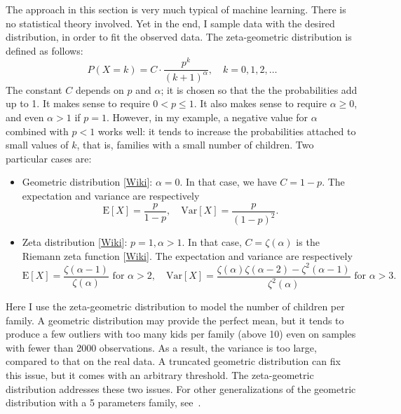 \documentclass[oneside,10pt]{book}
\begin{document}
The approach in this section is very much typical of machine learning. There is no statistical theory involved. Yet in the end,
 I sample data with the desired distribution, in order to fit the observed data. The
\textcolor{index}{zeta-geometric distribution} is defined as follows:
\begin{equation}
P(X = k) = C\cdot \frac{p^k}{(k+1)^\alpha},\quad k=0,1,2,\dots \label{treces}
\end{equation}
The constant $C$ depends on $p$ and $\alpha$; it is chosen so that the the probabilities add up to 1. It makes sense
 to require $0< p\leq 1$. It also makes sense to require $\alpha\geq 0$, and even $\alpha > 1$ if $p=1$. However, in my example,
  a negative value for $\alpha$ combined with $p<1$ works well: it tends to increase the probabilities attached to small values of $k$, that is, families with a small
 number of children.  Two particular cases are:\vspace{1ex}
\begin{itemize}
\item \textcolor{index}{Geometric distribution} [\href{https://en.wikipedia.org/wiki/Geometric_distribution}{Wiki}]: $\alpha = 0$. In that case, we have $C = 1-p$. The expectation and variance are respectively
 $$\text{E}[X]=\frac{p}{1-p}, \quad \text{Var}[X]=\frac{p}{(1-p)^2}.$$
\item \textcolor{index}{Zeta distribution} [\href{https://en.wikipedia.org/wiki/Zeta_distribution}{Wiki}]: $p=1,\alpha>1$. In that case, $C=\zeta(\alpha)$ is the
\textcolor{index}{Riemann zeta function} [\href{https://en.wikipedia.org/wiki/Riemann_zeta_function}{Wiki}]. The expectation and variance are respectively
 $$
\text{E}[X] =\frac{\zeta(\alpha-1)}{\zeta(\alpha)} \text{ for } \alpha>2, \quad
 \text{Var}[X] =\frac{\zeta(\alpha)\zeta(\alpha-2) - \zeta^2(\alpha-1)}{\zeta^2(\alpha)}  \text{ for } \alpha>3.
$$
\end{itemize}
Here I use the zeta-geometric distribution to model the number of children per family. A geometric distribution may provide the perfect mean, but it tends to produce
 a few outliers with too many kids per family (above 10) even on samples with fewer than 2000 observations. As a result, the variance is too large, compared to that on the real data. A truncated geometric distribution can fix this issue, but it comes with an
 arbitrary threshold. The zeta-geometric distribution addresses these two issues. For other generalizations of the geometric distribution  with a 5 parameters family, see~\cite{gammageo17}.
\end{document}

